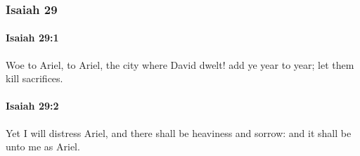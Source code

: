 	\subsubsection{Isaiah 29} %
		\label{ISAIAH-29}

		\paragraph{Isaiah 29:1} %
			\label{ISAIAH-29-1}

			Woe to Ariel, to Ariel, the city where David dwelt! add ye year to year; let them kill sacrifices.


		\paragraph{Isaiah 29:2} %
			\label{ISAIAH-29-2}

			Yet I will distress Ariel, and there shall be heaviness and sorrow: and it shall be unto me as Ariel.

